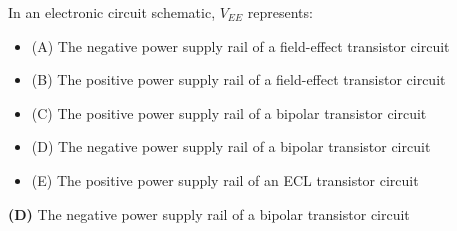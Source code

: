 

In an electronic circuit schematic, $V_{EE}$ represents:

\begin{itemize}
\item{(A)} The negative power supply rail of a field-effect transistor circuit
\vskip 5pt 
\item{(B)} The positive power supply rail of a field-effect transistor circuit
\vskip 5pt 
\item{(C)} The positive power supply rail of a bipolar transistor circuit
\vskip 5pt 
\item{(D)} The negative power supply rail of a bipolar transistor circuit
\vskip 5pt 
\item{(E)} The positive power supply rail of an ECL transistor circuit
\end{itemize}







{\bf (D)} The negative power supply rail of a bipolar transistor circuit
 










